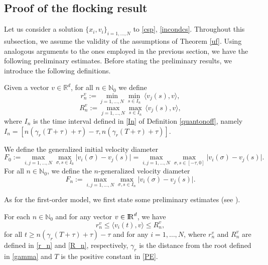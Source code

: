 \documentclass[11pt]{article}
\newcommand{\RR}{{{\rm I} \kern -.15em {\rm R} }}
\begin{document}
	\subsection{Proof of the flocking result}
	Let us consider a solution $\{x_{i},v_{i}\}_{i=1,\dots,N}$ to \eqref{csp}, \eqref{incondcs}. Throughout this subsection, we assume the validity of the assumptions of Theorem \ref{uf}. Using analogous arguments to the ones employed in the previous section, we have the following preliminary estimates. Before stating the preliminary results, we introduce the following definitions. 
	\begin{defn}\label{quantcs}
		Given a vector $v\in \mathbb{R}^d$, for all $n\in \mathbb{N}_0$ we define
		\begin{equation}\label{r_n}
			{r}_n^v:=\min_{j=1,\dots,N}\min_{s\in I_n}\,\langle v_{j}(s),v\rangle,
		\end{equation}
		\begin{equation}\label{R_n}
			{R}_n^v:=\max_{j=1,\dots,N}\max_{s\in I_n}\,\langle v_{j}(s),v\rangle,
		\end{equation}	
where $I_n$ is the time interval defined in \eqref{In} of Definition \ref{quantonoff}, namely
$I_n=[n(\gamma_r (T+\tau)+\tau)-\tau,n(\gamma_r (T+\tau)+\tau)].$
	\end{defn}
		\begin{defn}\label{Fn}
		We define the generalized initial velocity diameter
		\begin{equation}\label{F0}
			F_0:=\max_{i,j =1,\dots, N}\max_{\sigma,s\in I_0}\lvert v_i(\sigma)-v_j(s)\rvert=\max_{i,j =1,\dots, N}\max_{\sigma,s\in [-\tau,0]}\lvert v_i(\sigma)-v_j(s)\rvert.
		\end{equation}
		For all $n\in \mathbb{N}_0$, we define the $n$-generalized velocity diameter
		\begin{equation}\label{GVD}
			F_n:=\max_{i,j =1,\dots, N}\max_{\sigma,s\in I_n}\lvert v_i(\sigma)-v_j(s)\rvert.
		\end{equation}
	\end{defn}
	
{As for the first-order model, we first  state some preliminary estimates (see \cite{CCP}).}
\begin{lem}\label{L1cs}
	For each $n\in \mathbb{N}_0$ and for any vector $v\in \RR^{d}$, we have 
	\begin{equation}\label{scalpronoffcs}
		r_n^v\leq \langle v_{i}(t),v\rangle \leq R_n^v,
	\end{equation}for all  $t\geq n(\gamma_r(T+\tau)+\tau)-\tau$ and for any $i=1,\dots,N$, where $r_n^v$ and $R_n^v$ are defined in \eqref{r_n} and \eqref{R_n}, respectively, $\gamma_r$ is the distance from the root defined in \eqref{gamma} and $T$ is the positive constant in \eqref{PE}.
\end{lem}
\end{document}

